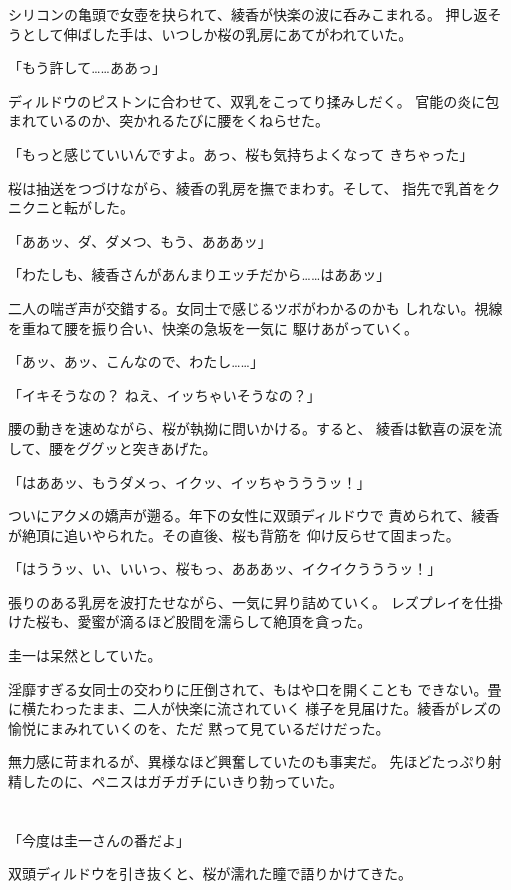 ﻿\documentclass[
    book,tate,
    line_length=30zw,
    jafontsize=12pt,
    paper=b5j,
    landscape,
    ]{jlreq}
\begin{document}
シリコンの亀頭で女壺を抉られて、綾香が快楽の波に呑みこまれる。
押し返そうとして伸ばした手は、いつしか桜の乳房にあてがわれていた。

「もう許して……ああっ」

ディルドウのピストンに合わせて、双乳をこってり揉みしだく。
官能の炎に包まれているのか、突かれるたびに腰をくねらせた。

「もっと感じていいんですよ。あっ、桜も気持ちよくなって
きちゃった」

桜は抽送をつづけながら、綾香の乳房を撫でまわす。そして、
指先で乳首をクニクニと転がした。

「ああッ、ダ、ダメつ、もう、あああッ」

「わたしも、綾香さんがあんまりエッチだから……はああッ」

二人の喘ぎ声が交錯する。女同士で感じるツボがわかるのかも
しれない。視線を重ねて腰を振り合い、快楽の急坂を一気に
駆けあがっていく。

「あッ、あッ、こんなので、わたし……」

「イキそうなの？ ねえ、イッちゃいそうなの？」

腰の動きを速めながら、桜が執拗に問いかける。すると、
綾香は歓喜の涙を流して、腰をググッと突きあげた。

「はああッ、もうダメっ、イクッ、イッちゃうううッ！」

ついにアクメの嬌声が遡る。年下の女性に双頭ディルドウで
責められて、綾香が絶頂に追いやられた。その直後、桜も背筋を
仰け反らせて固まった。

「はううッ、い、いいっ、桜もっ、あああッ、イクイクうううッ！」

張りのある乳房を波打たせながら、一気に昇り詰めていく。
レズプレイを仕掛けた桜も、愛蜜が滴るほど股間を濡らして絶頂を貪った。

圭一は呆然としていた。

淫靡すぎる女同士の交わりに圧倒されて、もはや口を開くことも
できない。畳に横たわったまま、二人が快楽に流されていく
様子を見届けた。綾香がレズの愉悦にまみれていくのを、ただ
黙って見ているだけだった。

無力感に苛まれるが、異様なほど興奮していたのも事実だ。
先ほどたっぷり射精したのに、ペニスはガチガチにいきり勃っていた。

\section*{}

「今度は圭一さんの番だよ」

双頭ディルドウを引き抜くと、桜が濡れた瞳で語りかけてきた。
\end{document}

